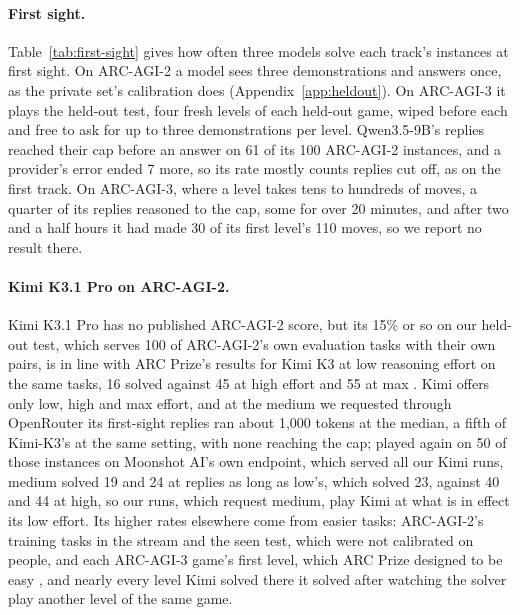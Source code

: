 \paragraph{First sight.} Table~\ref{tab:first-sight} gives how often three models solve each track's instances at first sight. On ARC-AGI-2 a model sees three demonstrations and answers once, as the private set's calibration does (Appendix~\ref{app:heldout}). On ARC-AGI-3 it plays the held-out test, four fresh levels of each held-out game, wiped before each and free to ask for up to three demonstrations per level. Qwen3.5-9B's replies reached their cap before an answer on 61 of its 100 ARC-AGI-2 instances, and a provider's error ended 7 more, so its rate mostly counts replies cut off, as on the first track. On ARC-AGI-3, where a level takes tens to hundreds of moves, a quarter of its replies reasoned to the cap, some for over 20 minutes, and after two and a half hours it had made 30 of its first level's 110 moves, so we report no result there.

\paragraph{Kimi K3.1 Pro on ARC-AGI-2.} Kimi K3.1 Pro has no published ARC-AGI-2 score, but its 15\% or so on our held-out test, which serves 100 of ARC-AGI-2's own evaluation tasks with their own pairs, is in line with ARC Prize's results for Kimi K3 at low reasoning effort on the same tasks, 16 solved against 45 at high effort and 55 at max \citep{arcprize2026leaderboard}. Kimi offers only low, high and max effort, and at the medium we requested through OpenRouter its first-sight replies ran about 1,000 tokens at the median, a fifth of Kimi-K3's at the same setting, with none reaching the cap; played again on 50 of those instances on Moonshot AI's own endpoint, which served all our Kimi runs, medium solved 19 and 24 at replies as long as low's, which solved 23, against 40 and 44 at high, so our runs, which request medium, play Kimi at what is in effect its low effort. Its higher rates elsewhere come from easier tasks: ARC-AGI-2's training tasks in the stream and the seen test, which were not calibrated on people, and each ARC-AGI-3 game's first level, which ARC Prize designed to be easy \citep{arcprize2026arcagi3}, and nearly every level Kimi solved there it solved after watching the solver play another level of the same game.

